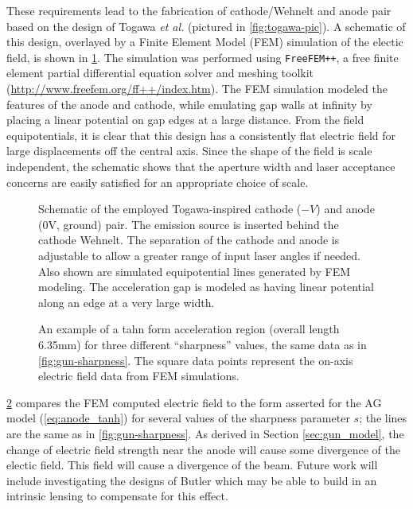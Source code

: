 These requirements lead to the fabrication of cathode/Wehnelt and anode pair based on the design of Togawa \textit{et al.} \cite{togawa_ceb6_2007} (pictured in \ref{fig:togawa-pic}).
A schematic of this design, overlayed by a Finite Element Model (FEM) simulation of the electic field, is shown in \ref{fig:gun-field}.
The simulation was performed using \texttt{FreeFEM++}, a free finite element partial differential equation solver and meshing toolkit (\url{http://www.freefem.org/ff++/index.htm}).
The FEM simulation modeled the features of the anode and cathode, while emulating gap walls at infinity by placing a linear potential on gap edges at a large distance.
From the field equipotentials, it is clear that this design has a consistently flat electric field for large displacements off the central axis.
Since the shape of the field is scale independent, the schematic shows that the aperture width and laser acceptance concerns are easily satisfied for an appropriate choice of scale.

\begin{figure}
  \centering
  
  \caption[Schematic of the employed Togawa-inspired custom cathode-anode pair]{
    Schematic of the employed Togawa-inspired cathode ($-V$) and anode (0V, ground) pair.
    The emission source is inserted behind the cathode Wehnelt.
    The separation of the cathode and anode is adjustable to allow a greater range of input laser angles if needed. 
    Also shown are simulated equipotential lines generated by FEM modeling.
    The acceleration gap is modeled as having linear potential along an edge at a very large width. 
  }
  \label{fig:gun-field}
\end{figure}

\begin{figure}
  \centering

  \begin{tikzpicture}
    
  \end{tikzpicture}

  \caption[An example of a tanh form acceleration region for three different ``sharpness'' values]{
    An example of a tahn form acceleration region (overall length 6.35mm) for three different ``sharpness'' values, the same data as in \ref{fig:gun-sharpness}.
    The square data points represent the on-axis electric field data from FEM simulations.
  }
  \label{fig:field_on_axis_fem}
\end{figure}

\ref{fig:field_on_axis_fem} compares the FEM computed electric field to the form asserted for the AG model (\ref{eq:anode_tanh}) for several values of the sharpness parameter $s$; the lines are the same as in \ref{fig:gun-sharpness}.
As derived in Section \ref{sec:gun_model}, the change of electric field strength near the anode will cause some divergence of the electic field.
This field will cause a divergence of the beam.
Future work will include investigating the designs of Butler %
which may be able to build in an intrinsic lensing to compensate for this effect.

